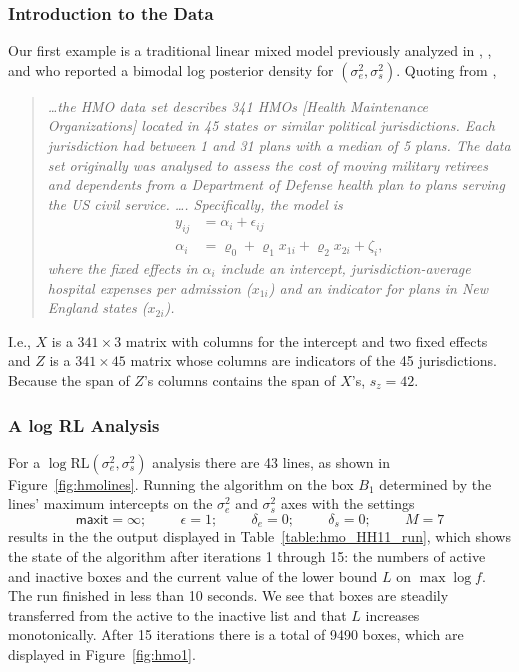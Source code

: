 \documentclass{report}
\newcommand{\textcompute}{\textsf}
\newcommand{\RLorig}{\text{RL}}
\newcommand{\logRLorig}{\log\RLorig}
\newcommand{\sigssq}{\sigma_s^2}
\newcommand{\sigesq}{\sigma_e^2}
\newcommand{\logRLssorig}{\logRLorig(\sigesq,\sigssq)}
\newcommand{\maxit}{\textcompute{maxit}}
\begin{document}
\subsubsection{Introduction to the Data}
Our first example is a traditional linear mixed model previously analyzed in \cite{hodges:98}, \cite{hodges:2013}, and \cite{henn&hodges:2014} who reported a bimodal log posterior density for $(\sigesq,\sigssq)$.  Quoting from \cite{henn&hodges:2014},
\begin{quote}
\itshape
\dots the HMO data set describes 341 HMOs [Health Maintenance Organizations] located in 45 states or similar political jurisdictions.  Each jurisdiction had between 1 and 31 plans with a median of 5 plans.  The data set originally was analysed to assess the cost of moving military retirees and dependents from a Department of Defense health plan to plans serving the US civil service.  \dots.  Specifically, the model is
\begin{equation*}
\begin{split}
	y_{ij} &= \alpha_i + \epsilon_{ij}\\
	\alpha_i &= \varrho_0 + \varrho_1x_{1i} + \varrho_2x_{2i} + \zeta_i,
\end{split}
\end{equation*}
where the fixed effects in $\alpha_i$ include an intercept, jurisdiction-average hospital expenses per admission ($x_{1i}$) and an indicator for plans in New England states ($x_{2i}$).

\upshape
\end{quote}
I.e., $X$ is a $341 \times 3$ matrix with columns for the intercept and two fixed effects and $Z$ is a $341 \times 45$ matrix whose columns are indicators of the 45 jurisdictions.  Because the span of $Z$'s columns contains the span of $X$'s, $s_z = 42$.  

\subsubsection{A log RL Analysis}
For a $\logRLssorig$ analysis there are 43 lines, as shown in Figure~\ref{fig:hmolines}.
Running the algorithm on the box $B_1$ determined by the lines' maximum intercepts on the $\sigesq$ and $\sigssq$ axes with the settings
\begin{equation*}
	\maxit=\infty; \hspace{1cm} \epsilon=1; \hspace{1cm}
	\delta_e=0; \hspace{1cm} \delta_s=0; \hspace{1cm} M=7
\end{equation*}
results in the the output displayed in Table~\ref{table:hmo_HH11_run}, which shows the state of the algorithm after iterations 1 through 15: the numbers of active and inactive boxes and the current value of the lower bound $L$ on $\max\log f$. The run finished in less than 10 seconds.  We see that boxes are steadily transferred from the active to the inactive list and that $L$ increases monotonically.  After 15 iterations there is a total of 9490 boxes, which are displayed in Figure~\ref{fig:hmo1}.
\end{document}
